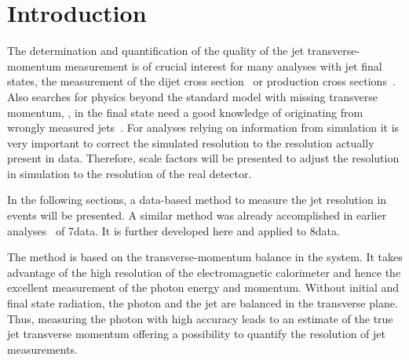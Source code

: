 \chapter{Introduction}
\label{res:ch:Introduction}

The determination and quantification of the quality of the jet transverse-momentum measurement is of crucial interest for many analyses with jet final states, \eg the measurement of the dijet cross section~\cite{bib:CMS:QCD_measurements} or \ttbar production cross sections~\cite{bib:CMS:TopCrossSection_8TeV}. 
Also searches for physics beyond the standard model with missing transverse momentum, \PTm, in the final state need a good knowledge of \PTm originating from wrongly measured jets~\cite{bib:CMS:RA2_8TeV,bib:CMS:MT2_8TeV,bib:CMS:AlphaT_8TeV}.
For analyses relying on information from simulation it is very important to correct the simulated resolution to the resolution actually present in data.
Therefore, scale factors will be presented to adjust the resolution in simulation to the resolution of the real detector.  
  
In the following sections, a data-based method to measure the jet \pt resolution in \GAMJET events will be presented. 
A similar method was already accomplished in earlier analyses~\cite{bib:CMS:JERCPaper_2011,bib:CMS-AN-2010-076,bib:CMS-AN-2010-141,bib:CMS-AN-2011-004} of 7\tev data.  
It is further developed here and applied to 8\tev data.

The method is based on the transverse-momentum balance in the \GAMJET system. 
It takes advantage of the high resolution of the electromagnetic calorimeter and hence the excellent measurement of the photon energy and momentum.
Without initial and final state radiation, the photon and the jet are balanced in the transverse plane. 
Thus, measuring the photon \pt with high accuracy leads to an estimate of the true jet transverse momentum offering a possibility to quantify the resolution of jet \pt measurements.


